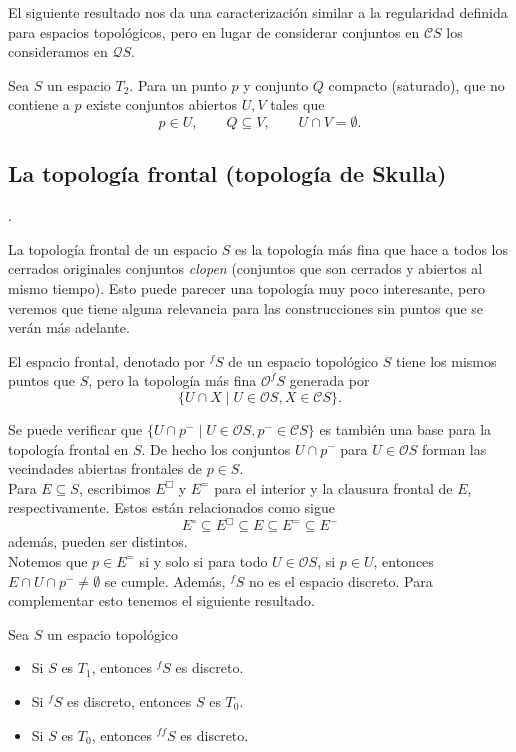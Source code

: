 El siguiente resultado nos da una caracterización similar a la regularidad definida para espacios topológicos, pero en lugar de considerar conjuntos en $\mathcal{C}S$ los consideramos en $\mathcal{Q}S$. 

\begin{cor}
    Sea $S$ un espacio $T_2$. Para un punto $p$ y conjunto $Q$ compacto (saturado), que no contiene a $p$ existe conjuntos abiertos $U, V$ tales que
    \[
    p\in U, \qquad Q\subseteq V, \qquad U\cap V=\emptyset.
    \]
\end{cor}

\subsection{La topología frontal (topología de Skulla)}.

La topología frontal de un espacio $S$ es la topología más fina que hace a todos los cerrados originales conjuntos \emph{clopen} (conjuntos que son cerrados y abiertos al mismo tiempo). Esto puede parecer una topología muy poco interesante, pero veremos que tiene alguna relevancia para las construcciones sin puntos que se verán más adelante.

\begin{dfn}\label{Frontal}
    El espacio frontal, denotado por $^fS$ de un espacio topológico $S$ tiene los mismos puntos que $S$, pero la topología más fina $\mathcal{O}^fS$ generada por 
    \[
    \{U\cap X\mid U\in \mathcal{O}S, X\in \mathcal{C}S\}.
    \]
\end{dfn}

Se puede verificar que $\{U\cap p^-\mid U\in \mathcal{O}S, p^-\in \mathcal{C}S\}$ es también una base para la topología frontal en $S$. De hecho los conjuntos $U\cap p^-$ para $U\in \mathcal{O}S$ forman las vecindades abiertas frontales de $p\in S$.\\

Para $E\subseteq S$, escribimos $E^\Box$ y $E^=$ para el interior y la clausura frontal de $E$, respectivamente. Estos están relacionados como sigue 
\[
E^\circ\subseteq E^\Box \subseteq E\subseteq E^=\subseteq E^-
\]
además, pueden ser distintos.\\

Notemos que $p\in E^=$ si y solo si para todo $U\in \mathcal{O}S$, si $p\in U$, entonces $E\cap U\cap p^-\neq \emptyset$ se cumple. Además, $^fS$ no es el espacio discreto. Para complementar esto tenemos el siguiente resultado.

\begin{lem}
    Sea $S$ un espacio topológico
    \begin{itemize}
        \item Si $S$ es $T_1$, entonces $^fS$ es discreto.
        \item Si $^fS$ es discreto, entonces $S$ es $T_0$.
        \item Si $S$ es $T_0$, entonces $^{ff}S$ es discreto.
    \end{itemize}
\end{lem}

